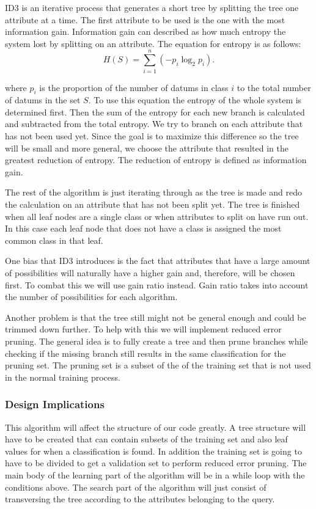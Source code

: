 \documentclass{article}
\begin{document}
				ID3 is an iterative process that generates a short tree by splitting the tree one attribute at a time. 
				The first attribute to be used is the one with the most information gain. 
				Information gain can described as how much entropy the system lost by splitting on an attribute. 
				The equation for entropy is as follows:
				\begin{equation*}
					H(S) = \sum_{i=1}^{n} \left( -p_i \log_2 p_i \right). 
				\end{equation*}		
				
				where $p_i$ is the proportion of the number of datums in class $i$ to the total number of datums in the set $S$. 
				To use this equation the entropy of the whole system is determined first. 
				Then the sum of the entropy for each new branch is calculated and subtracted from the total entropy. We try to branch on each attribute that has not been used yet. Since the goal is to maximize this difference so the tree will be small and more general, we choose the attribute that resulted in the greatest reduction of entropy. The reduction of entropy is defined as information gain.
				
				The rest of the algorithm is just iterating through as the tree is made and redo the calculation on an attribute that has not been split yet. 
				The tree is finished when all leaf nodes are a single class or when attributes to split on have run out.
				 In this case each leaf node that does not have a class is assigned the most common class in that leaf.
				
				One bias that ID3 introduces is the fact that attributes that have a large amount of possibilities will naturally have a higher gain and, therefore, will be chosen first. 
				To combat this we will use gain ratio instead. 
				Gain ratio takes into account the number of possibilities for each algorithm.
				
				Another problem is that the tree still might not be general enough and could be trimmed down further. 
				To help with this we will implement reduced error pruning. 
				The general idea is to fully create a tree and then prune branches while checking if the missing branch still results in the same classification for the pruning set. 
				The pruning set is a subset of the of the training set that is not used in the normal training process.
			\subsubsection{Design Implications}
				This algorithm will affect the structure of our code greatly. 
				A tree structure will have to be created that can contain subsets of the training set and also leaf values for when a classification is found. 
				In addition the training set is going to have to be divided to get a validation set to perform reduced error pruning. 
				The main body of the learning part of the algorithm will be in a while loop with the conditions above. 
				The search part of the algorithm will just consist of transversing the tree according to the attributes belonging to the query.
\end{document}
